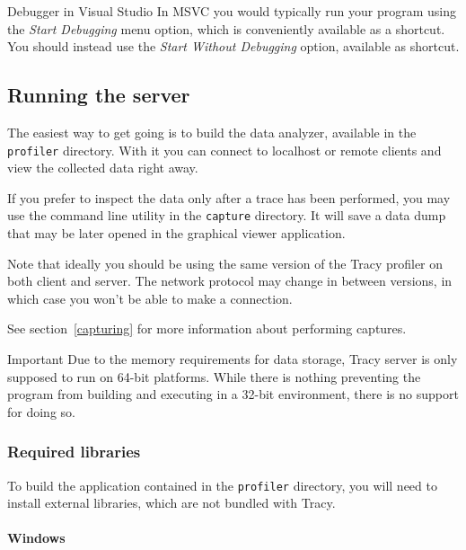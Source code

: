 \documentclass[hidelinks,titlepage,a4paper]{article}
\begin{document}
\begin{bclogo}[
noborder=true,
couleur=black!5,
logo=\bclampe
]{Debugger in Visual Studio}
In MSVC you would typically run your program using the \emph{Start Debugging} menu option, which is conveniently available as a  shortcut. You should instead use the \emph{Start Without Debugging} option, available as  shortcut.
\end{bclogo}

\subsection{Running the server}

The easiest way to get going is to build the data analyzer, available in the \texttt{profiler} directory. With it you can connect to localhost or remote clients and view the collected data right away.

If you prefer to inspect the data only after a trace has been performed, you may use the command line utility in the \texttt{capture} directory. It will save a data dump that may be later opened in the graphical viewer application.

Note that ideally you should be using the same version of the Tracy profiler on both client and server. The network protocol may change in between versions, in which case you won't be able to make a connection.

See section~\ref{capturing} for more information about performing captures.

\begin{bclogo}[
noborder=true,
couleur=black!5,
logo=\bcbombe
]{Important}
Due to the memory requirements for data storage, Tracy server is only supposed to run on 64-bit platforms. While there is nothing preventing the program from building and executing in a 32-bit environment, there is no support for doing so.
\end{bclogo}

\subsubsection{Required libraries}

To build the application contained in the \texttt{profiler} directory, you will need to install external libraries, which are not bundled with Tracy.

\paragraph{Windows}
\end{document}
